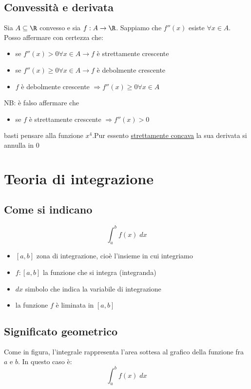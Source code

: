 \subsection{Convessità e derivata}
Sia $ A \subseteq  \R$ convesso e sia $ f: A \to \R$. Sappiamo che $f''\left( x \right) $ esiste $ \forall x \in  A$. Posso affermare con certezza che:
\begin{itemize}
	\item se $f''\left( x \right)  > 0 \forall x \in  A \rightarrow f$ è strettamente crescente
	\item se $f''\left( x \right)  \ge 0 \forall x \in  A \rightarrow f$ è debolmente crescente
	\item $f$ è debolmente crescente $ \Rightarrow f''\left( x \right) \ge 0 \forall  x \in A$
\end{itemize}
NB: è falso affermare che
\begin{itemize}
	\item se $f$ è strettamente crescente $ \Rightarrow f''\left( x \right) > 0 $
\end{itemize}
basti pensare alla funzione $x^4$.Pur essento \underline{strettamente concava} la sua derivata si annulla in 0
\section{Teoria di integrazione}
\subsection{Come si indicano}
\[
	\int_{a}^{b} f\left( x \right)  \; dx
\]
\begin{itemize}
	\item $\left[ a,b \right] $ zona di integrazione, cioè l'insieme in cui integriamo
	\item $f: \left[ a,b \right] $ la funzione che si integra (integranda)
	\item $dx$ simbolo che indica la variabile di integrazione
	\item la funzione $f$ è liminata in $\left[ a,b \right] $
\end{itemize}
\subsection{Significato geometrico}
Come in figura, l'integrale rappresenta l'area sottesa al grafico della funzione fra $ a $ e $ b $. In questo caso è:
\[
	\int_{a}^{b} f\left( x \right)  \; dx
\]

